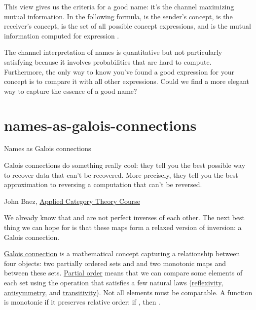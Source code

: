 \documentclass{article}
\begin{document}
This view gives us the criteria for a good name: it's the channel maximizing mutual information.
In the following formula,  is the sender's concept,  is the receiver's concept,  is the set of all possible concept expressions, and  is the mutual information computed for expression .


The channel interpretation of names is quantitative but not particularly satisfying because it involves probabilities that are hard to compute.
Furthermore, the only way to know you've found a good expression for your concept is to compare it with all other expressions.
Could we find a more elegant way to capture the essence of a good name?

\section{names-as-galois-connections}{Names as Galois connections}
\epigraph{
  Galois connections do something really cool: they tell you the best possible way to recover data that can't be recovered.
  More precisely, they tell you the best approximation to reversing a computation that can't be reversed.
}{John Baez, \href{https://math.ucr.edu/home/baez/act_course/lecture_5.html}{Applied Category Theory Course}}

We already know that  and  are not perfect inverses of each other.
The next best thing we can hope for is that these maps form a relaxed version of inversion: a Galois connection.

\href{https://en.wikipedia.org/wiki/Galois_connection}{Galois connection} is a mathematical concept capturing a relationship between four objects: two partially ordered sets  and  and two monotonic maps  and  between these sets.
\href{https://en.wikipedia.org/wiki/Partially_ordered_set#Partial_orders}{Partial order} means that we can compare some elements of each set using the \math{\leq} operation that satisfies a few natural laws (\href{https://en.wikipedia.org/wiki/Reflexive_relation}{reflexivity}, \href{https://en.wikipedia.org/wiki/Antisymmetric_relation}{antisymmetry}, and \href{https://en.wikipedia.org/wiki/Transitive_relation}{transitivity}).
Not all elements must be comparable.
A function  is monotonic if it preserves relative order: if , then .
\end{document}
